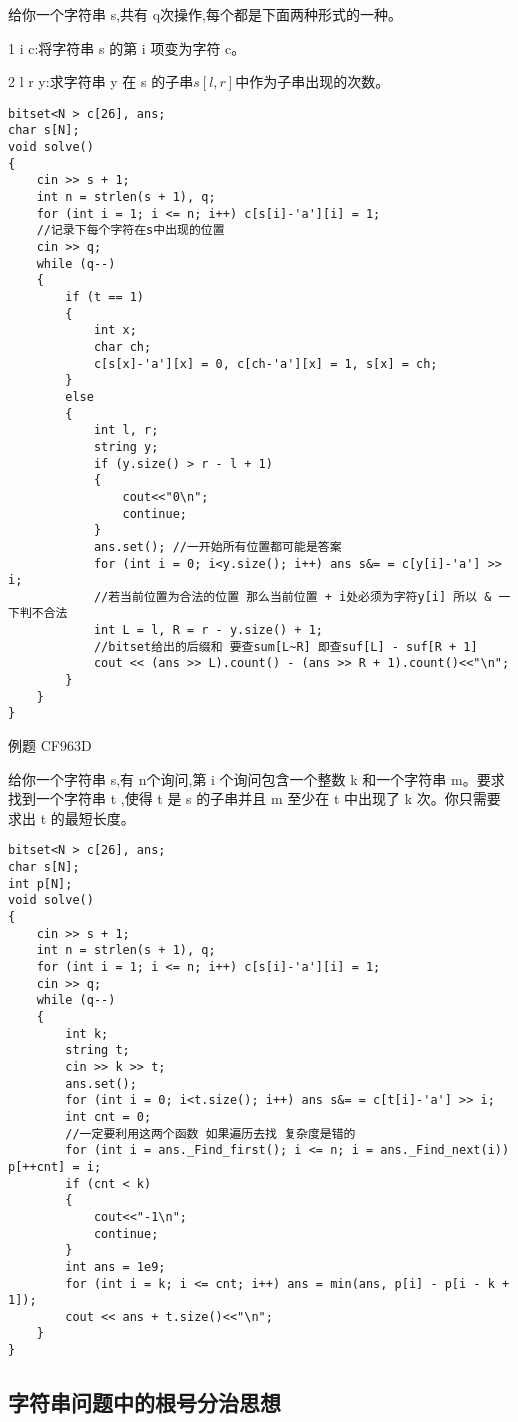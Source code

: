\documentclass[a4paper, fontset=none]{ctexart}
\begin{document}
给你一个字符串 s,共有 q次操作,每个都是下面两种形式的一种。

1 i c:将字符串 s 的第 i 项变为字符 c。

2 l r y:求字符串 y 在 s 的子串$s [l , r]$中作为子串出现的次数。

\begin{verbatim}
bitset<N > c[26], ans;
char s[N];
void solve()
{
    cin >> s + 1;
    int n = strlen(s + 1), q;
    for (int i = 1; i <= n; i++) c[s[i]-'a'][i] = 1;
    //记录下每个字符在s中出现的位置
    cin >> q;
    while (q--)
    {
        if (t == 1)
        {
            int x;
            char ch;
            c[s[x]-'a'][x] = 0, c[ch-'a'][x] = 1, s[x] = ch;
        }
        else
        {
            int l, r;
            string y;
            if (y.size() > r - l + 1)
            {
                cout<<"0\n";
                continue;
            }
            ans.set(); //一开始所有位置都可能是答案
            for (int i = 0; i<y.size(); i++) ans s&= = c[y[i]-'a'] >> i;
            //若当前位置为合法的位置 那么当前位置 + i处必须为字符y[i] 所以 & 一下判不合法
            int L = l, R = r - y.size() + 1;
            //bitset给出的后缀和 要查sum[L~R] 即查suf[L] - suf[R + 1]
            cout << (ans >> L).count() - (ans >> R + 1).count()<<"\n";
        }
    }
}
\end{verbatim}

例题 CF963D

给你一个字符串 s,有 n个询问,第 i 个询问包含一个整数 k 和一个字符串 m。要求找到一个字符串 t ,使得 t 是 s 的子串并且 m 至少在 t 中出现了 k 次。你只需要求出 t 的最短长度。

\begin{verbatim}
bitset<N > c[26], ans;
char s[N];
int p[N];
void solve()
{
    cin >> s + 1;
    int n = strlen(s + 1), q;
    for (int i = 1; i <= n; i++) c[s[i]-'a'][i] = 1;
    cin >> q;
    while (q--)
    {
        int k;
        string t;
        cin >> k >> t;
        ans.set();
        for (int i = 0; i<t.size(); i++) ans s&= = c[t[i]-'a'] >> i;
        int cnt = 0;
        //一定要利用这两个函数 如果遍历去找 复杂度是错的
        for (int i = ans._Find_first(); i <= n; i = ans._Find_next(i)) p[++cnt] = i;
        if (cnt < k)
        {
            cout<<"-1\n";
            continue;
        }
        int ans = 1e9;
        for (int i = k; i <= cnt; i++) ans = min(ans, p[i] - p[i - k + 1]);
        cout << ans + t.size()<<"\n";
    }
}
\end{verbatim}
\subsection{字符串问题中的根号分治思想}
\end{document}
